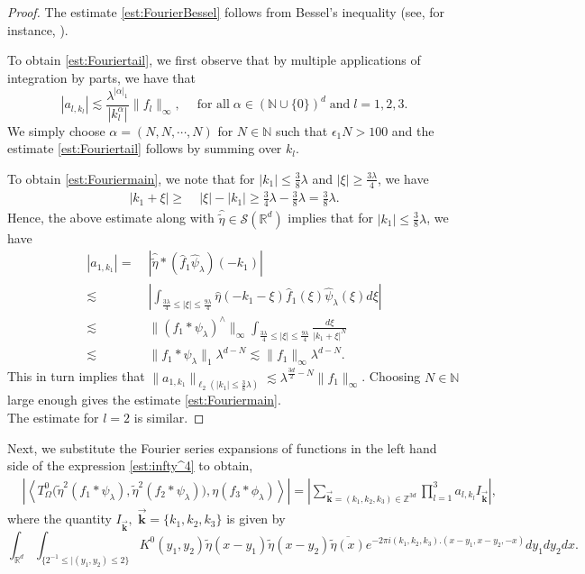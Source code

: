 \documentclass[a4paper,reqno]{amsart}
\newcommand{\R}{{\mathbb R}}       %
\newcommand{\N}{{\mathbb N}}
\newcommand{\Z}{{\mathbb Z}}
\theoremstyle{definition}
\numberwithin{equation}{section}
\begin{document}
\begin{proof}
	The estimate \eqref{est:FourierBessel} follows from Bessel's inequality (see, for instance, \cite[Proposition 3.2.6]{GrafakosclassicalFA}).

	To obtain \eqref{est:Fouriertail}, we first observe that by multiple applications of integration by parts, we have that
	\[|a_{l,k_l}|\lesssim\frac{\lambda^{|\alpha|_1}}{|k_l^\alpha|}\|f_l\|_\infty,\quad\;\text{for all}\;\alpha\in(\N\cup\{0\})^d\;\text{and}\;l=1,2,3.\]
	We simply choose $\alpha=(N,N,\cdots,N)$ for $N\in\N$ such that $\epsilon_1N>100$ and the estimate \eqref{est:Fouriertail} follows by summing over $k_l$.

	To obtain \eqref{est:Fouriermain}, we note that for $|k_1|\leq\frac{3}{8}\lambda$ and $|\xi|\geq\frac{3\lambda}{4}$, we have
	\begin{align*}
		|k_1+\xi|\geq&\;|\xi|-|k_1|
		\geq\frac{3}{4}\lambda-\frac{3}{8}\lambda=\frac{3}{8}\lambda.
	\end{align*}
	Hence, the above estimate along with $\widehat{\widetilde\eta}\in\mathcal{S}(\R^d)$ implies that for $|k_1|\leq\frac{3}{8}\lambda$, we have
	\begin{align*}
		|a_{1,k_1}|=&\;\left|\widehat{\widetilde\eta}*(\widehat{f}_1\widehat{\psi}_\lambda)(- k_1)\right|\\
		\lesssim&\;\left|\int_{\frac{3\lambda}{4}\leq|\xi|\leq\frac{9\lambda}{4}}\widehat{\eta}(-k_1-\xi)\widehat{f}_1(\xi)\widehat{\psi}_\lambda(\xi)d\xi\right|\\
		\lesssim&\;\|(f_1*\psi_\lambda)^\wedge\|_\infty\int_{\frac{3\lambda}{4}\leq|\xi|\leq\frac{9\lambda}{4}}\frac{d\xi}{|k_1+\xi|^N}\\
		\lesssim&\;\|f_1*\psi_\lambda\|_1 \lambda^{d-N}\lesssim\|f_1\|_\infty \lambda^{d-N}.
	\end{align*}
	This in turn implies that $\|a_{1,k_1}\|_{\ell_2(|k_1|\leq\frac{3}{8}\lambda)}\lesssim\lambda^{\frac{3d}{2}-N}\|f_1\|_\infty$. Choosing $N\in\N$ large enough gives the estimate \eqref{est:Fouriermain}. \\
	The estimate for $l=2$ is similar.
\end{proof}

Next, we substitute the Fourier series expansions of functions in the left hand side of the expression \eqref{est:infty^4} to obtain,
\begin{align*}
	&\left|\left\langle T^0_\Omega\Big(\widetilde\eta^2(f_1*\psi_\lambda),\widetilde\eta^2(f_2*\psi_\lambda)\Big),\eta(f_3*\phi_{\lambda})\right\rangle\right|=\left|\sum_{\vec{\mathbf{k}}=(k_1,k_2,k_3)\in\Z^{3d}}\prod_{l=1}^{3}a_{l,k_l}I_{\vec{\mathbf{k}}}\right|,
\end{align*}
where the quantity $I_{\vec{\mathbf{k}}},\;\vec{\mathbf{k}}=\{k_1,k_2,k_3\}$ is given by
\[\int_{\R^d}\int_{\{2^{-1}\leq|(y_1,y_2)\leq2\}}K^0(y_1,y_2)\widetilde\eta(x-y_1)\widetilde\eta(x-y_2)\overline{\widetilde\eta(x)}e^{-2\pi i(k_1,k_2,k_3).(x-y_1,x-y_2,-x)}dy_1dy_2dx.\]
\end{document}
